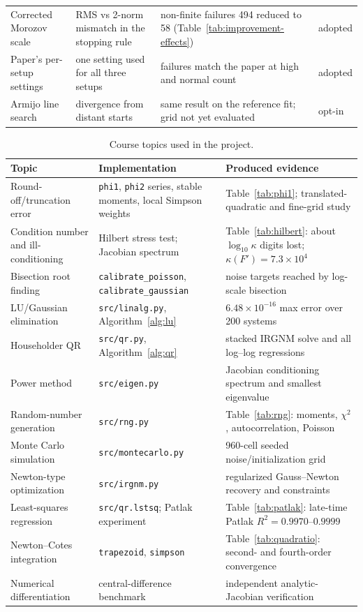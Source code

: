 \documentclass[sigconf,nonacm]{acmart}
\newcommand{\sci}[2]{\ensuremath{#1\times10^{#2}}}
\begin{document}
\begin{table}[t]
\begin{tabular}{p{}p{}p{}p{}}
Corrected Morozov scale & RMS vs 2-norm mismatch in the stopping rule & non-finite failures 494 reduced to 58 (Table~\ref{tab:improvement-effects}) & adopted \\
Paper's per-setup settings & one setting used for all three setups & failures match the paper at high and normal count & adopted \\
Armijo line search & divergence from distant starts & same result on the reference fit; grid not yet evaluated & opt-in \\
\bottomrule
\end{tabular}
\end{table}

\begin{table}[t]
\caption{Course topics used in the project.}
\label{tab:course}
\small
\begin{tabular}{p{}p{}p{}}
\toprule
Topic & Implementation & Produced evidence \\
\midrule
Round-off/truncation error & \texttt{phi1}, \texttt{phi2} series, stable moments, local Simpson weights & Table~\ref{tab:phi1}; translated-quadratic and fine-grid study \\
Condition number and ill-conditioning & Hilbert stress test; Jacobian spectrum & Table~\ref{tab:hilbert}: about $\log_{10}\kappa$ digits lost; $\kappa(F')=\sci{7.3}{4}$ \\
Bisection root finding & \texttt{calibrate\_poisson}, \texttt{calibrate\_gaussian} & noise targets reached by log-scale bisection \\
LU/Gaussian elimination & \texttt{src/linalg.py}, Algorithm~\ref{alg:lu} & $6.48\times10^{-16}$ max error over 200 systems \\
Householder QR & \texttt{src/qr.py}, Algorithm~\ref{alg:qr} & stacked IRGNM solve and all log--log regressions \\
Power method & \texttt{src/eigen.py} & Jacobian conditioning spectrum and smallest eigenvalue \\
Random-number generation & \texttt{src/rng.py} & Table~\ref{tab:rng}: moments, $\chi^2$, autocorrelation, Poisson \\
Monte Carlo simulation & \texttt{src/montecarlo.py} & 960-cell seeded noise/initialization grid \\
Newton-type optimization & \texttt{src/irgnm.py} & regularized Gauss--Newton recovery and constraints \\
Least-squares regression & \texttt{src/qr.lstsq}; Patlak experiment~\cite{patlak1983} & Table~\ref{tab:patlak}: late-time Patlak $R^2=0.9970$--$0.9999$ \\
Newton--Cotes integration & \texttt{trapezoid}, \texttt{simpson} & Table~\ref{tab:quadratio}: second- and fourth-order convergence \\
Numerical differentiation & central-difference benchmark & independent analytic-Jacobian verification \\
\bottomrule
\end{tabular}
\end{table}
\end{document}
